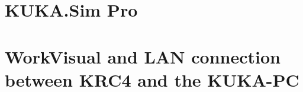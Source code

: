 \cleardoublepage
\part{KUKA.Sim Pro}        \cleardoublepage
 \cleardoublepage

\part {WorkVisual and LAN connection between KRC4 and the KUKA-PC}
\cleardoublepage


%
%
